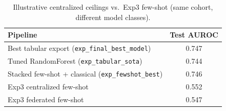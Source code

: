 \begin{table}[htbp]
  \centering
  \caption{Illustrative centralized ceilings vs.\ Exp3 few-shot (same cohort, different model classes).}
  \label{tab:context}
  \begin{tabular}{lc}
    \toprule
    Pipeline & Test AUROC \\
    \midrule
    Best tabular export (\texttt{exp\_final\_best\_model}) & 0.747 \\
    Tuned RandomForest (\texttt{exp\_tabular\_sota}) & 0.744 \\
    Stacked few-shot + classical (\texttt{exp\_fewshot\_best}) & 0.746 \\
    Exp3 centralized few-shot & 0.552 \\
    Exp3 federated few-shot & 0.547 \\
    \bottomrule
  \end{tabular}
\end{table}
